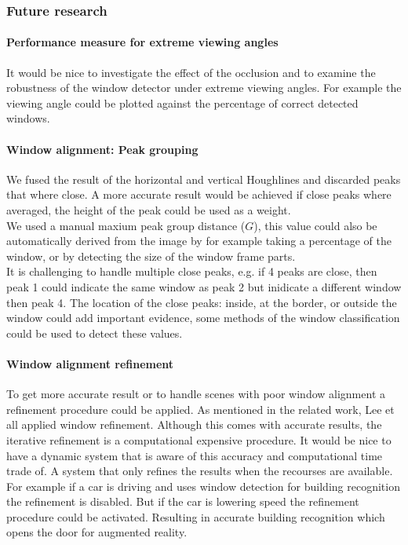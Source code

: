 \subsubsection{Future research} %
\paragraph{Performance measure for extreme viewing angles}
It would be nice to investigate the effect of the occlusion and to examine the
robustness of the window detector under extreme viewing angles.
For example the viewing angle could be plotted against the percentage of
correct detected windows.

\paragraph{Window alignment: Peak grouping}
We fused the result of the horizontal and vertical Houghlines and discarded
peaks that where close.  A more accurate result would be achieved if close peaks
where averaged, the height of the peak could be used as a weight.\\
We used a manual maxium peak group distance ($G$), this value could also be automatically derived from the image
by for example taking a percentage of the window, or by detecting the size of the window frame parts.\\ 
It is challenging to handle multiple close peaks, e.g. if 4 peaks
are close, then peak 1 could indicate the same window as peak 2 but inidicate a different window then peak 4. The location of the close peaks: inside, at the border, or outside the window could add important evidence, some methods of the window classification could be used to detect these values.

\paragraph{Window alignment refinement}
To get more accurate result or to handle scenes with poor window alignment a refinement procedure could be applied.
As mentioned in the related work, Lee et all \cite{Lee_extraction} applied window refinement.
Although this comes with accurate results, the iterative refinement is a
computational expensive procedure. 
It would be nice to have a dynamic system that is aware of this 
accuracy and computational time trade of. A system that only refines the results when the recourses are available.
For example if a car is driving and uses window detection for building recognition the refinement is disabled.
But if the car is lowering speed the refinement procedure could be activated.
Resulting in accurate building recognition which opens the door for augmented reality.

